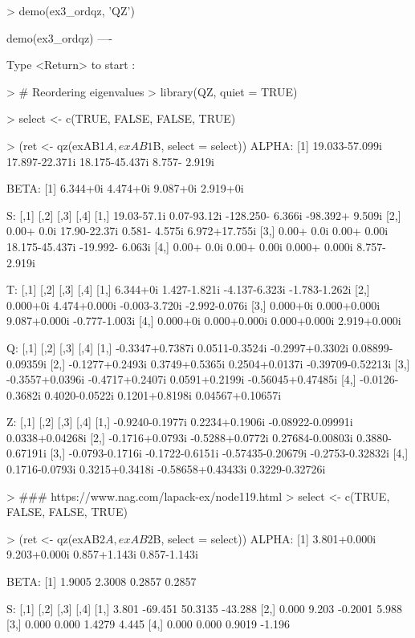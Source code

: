 \begin{Code}[title=QZ demo ex3\_ordqz]
> demo(ex3_ordqz, 'QZ')


	demo(ex3_ordqz)
	---- ~~~~~~~~~

Type  <Return>	 to start : 

> # Reordering eigenvalues
> library(QZ, quiet = TRUE)

> select <- c(TRUE, FALSE, FALSE, TRUE)

> (ret <- qz(exAB1$A, exAB1$B, select = select))
ALPHA:
[1] 19.033-57.099i 17.897-22.371i 18.175-45.437i  8.757- 2.919i

BETA:
[1] 6.344+0i 4.474+0i 9.087+0i 2.919+0i

S:
            [,1]         [,2]             [,3]            [,4]
[1,] 19.03-57.1i  0.07-93.12i -128.250- 6.366i -98.392+ 9.509i
[2,]  0.00+ 0.0i 17.90-22.37i    0.581- 4.575i   6.972+17.755i
[3,]  0.00+ 0.0i  0.00+ 0.00i   18.175-45.437i -19.992- 6.063i
[4,]  0.00+ 0.0i  0.00+ 0.00i    0.000+ 0.000i   8.757- 2.919i

T:
         [,1]         [,2]          [,3]          [,4]
[1,] 6.344+0i 1.427-1.821i -4.137-6.323i -1.783-1.262i
[2,] 0.000+0i 4.474+0.000i -0.003-3.720i -2.992-0.076i
[3,] 0.000+0i 0.000+0.000i  9.087+0.000i -0.777-1.003i
[4,] 0.000+0i 0.000+0.000i  0.000+0.000i  2.919+0.000i

Q:
                [,1]            [,2]            [,3]              [,4]
[1,] -0.3347+0.7387i  0.0511-0.3524i -0.2997+0.3302i  0.08899-0.09359i
[2,] -0.1277+0.2493i  0.3749+0.5365i  0.2504+0.0137i -0.39709-0.52213i
[3,] -0.3557+0.0396i -0.4717+0.2407i  0.0591+0.2199i -0.56045+0.47485i
[4,] -0.0126-0.3682i  0.4020-0.0522i  0.1201+0.8198i  0.04567+0.10657i

Z:
                [,1]            [,2]              [,3]             [,4]
[1,] -0.9240-0.1977i  0.2234+0.1906i -0.08922-0.09991i  0.0338+0.04268i
[2,] -0.1716+0.0793i -0.5288+0.0772i  0.27684-0.00803i  0.3880-0.67191i
[3,] -0.0793-0.1716i -0.1722-0.6151i -0.57435-0.20679i -0.2753-0.32832i
[4,]  0.1716-0.0793i  0.3215+0.3418i -0.58658+0.43433i  0.3229-0.32726i

> ### https://www.nag.com/lapack-ex/node119.html
> select <- c(TRUE, FALSE, FALSE, TRUE)

> (ret <- qz(exAB2$A, exAB2$B, select = select))
ALPHA:
[1] 3.801+0.000i 9.203+0.000i 0.857+1.143i 0.857-1.143i

BETA:
[1] 1.9005 2.3008 0.2857 0.2857

S:
      [,1]    [,2]    [,3]    [,4]
[1,] 3.801 -69.451 50.3135 -43.288
[2,] 0.000   9.203 -0.2001   5.988
[3,] 0.000   0.000  1.4279   4.445
[4,] 0.000   0.000  0.9019  -1.196


\end{Code}
